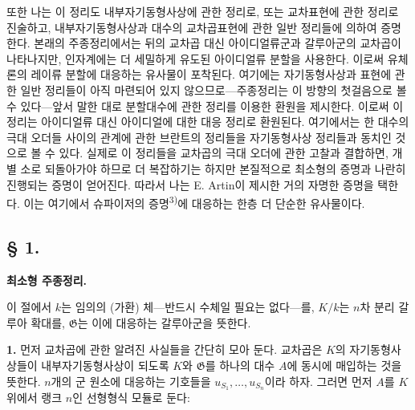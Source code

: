또한 나는 이 정리도 내부자기동형사상에 관한 정리로, 또는 교차표현에 관한 정리로 진술하고, 내부자기동형사상과 대수의 교차곱표현에 관한 일반 정리들에 의하여 증명한다. 본래의 주종정리에서는 뒤의 교차곱 대신 아이디얼류군과 갈루아군의 교차곱이 나타나지만, 인자계에는 더 세밀하게 유도된 아이디얼류 분할을 사용한다. 이로써 유체론의 레이류 분할에 대응하는 유사물이 포착된다. 여기에는 자기동형사상과 표현에 관한 일반 정리들이 아직 마련되어 있지 않으므로---주종정리는 이 방향의 첫걸음으로 볼 수 있다---앞서 말한 대로 분할대수에 관한 정리를 이용한 환원을 제시한다. 이로써 이 정리는 아이디얼류 대신 아이디얼에 대한 대응 정리로 환원된다. 여기에서는 한 대수의 극대 오더들 사이의 관계에 관한 브란트의 정리들을 자기동형사상 정리들과 동치인 것으로 볼 수 있다. 실제로 이 정리들을 교차곱의 극대 오더에 관한 고찰과 결합하면, 개별 소로 되돌아가야 하므로 더 복잡하기는 하지만 본질적으로 최소형의 증명과 나란히 진행되는 증명이 얻어진다. 따라서 나는 E. Artin이 제시한 거의 자명한 증명을 택한다. 이는 여기에서 슈파이저의 증명\textsuperscript{3)}에 대응하는 한층 더 단순한 유사물이다.

\subsection*{§ 1.}
\begin{center}
\textbf{최소형 주종정리.}
\end{center}

이 절에서 \(k\)는 임의의 (가환) 체---반드시 수체일 필요는 없다---를, \(K/k\)는 \(n\)차 분리 갈루아 확대를, \(\mathfrak G\)는 이에 대응하는 갈루아군을 뜻한다.

\noindent\textbf{1.} 먼저 교차곱에 관한 알려진 사실들을 간단히 모아 둔다. 교차곱은 \(K\)의 자기동형사상들이 내부자기동형사상이 되도록 \(K\)와 \(\mathfrak G\)를 하나의 대수 \(A\)에 동시에 매입하는 것을 뜻한다. \(n\)개의 군 원소에 대응하는 기호들을 \(u_{S_1},\ldots,u_{S_n}\)이라 하자. 그러면 먼저 \(A\)를 \(K\) 위에서 랭크 \(n\)인 선형형식 모듈로 둔다:


